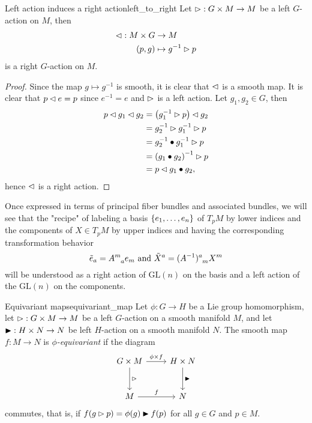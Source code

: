 \begin{proposition}{Left action induces a right action}{left_to_right}
    Let \(\mathbin{\vartriangleright} : G \times M \to M\) be a left \(G\)-action on \(M\), then
    \begin{align*}
        \mathbin{\vartriangleleft} : M \times G &\to M\\
                      (p,g)&\mapsto g^{-1} \mathbin{\vartriangleright} p
    \end{align*}
    is a right \(G\)-action on \(M.\)
\end{proposition}
\begin{proof}
    Since the map \(g \mapsto g^{-1}\) is smooth, it is clear that \(\mathbin{\vartriangleleft}\) is a smooth map. It is clear that \(p \mathbin{\vartriangleleft} e = p\) since \(e^{-1} = e\) and \(\mathbin{\vartriangleright}\) is a left action. Let \(g_1, g_2 \in G\), then
    \begin{align*}
        p \mathbin{\vartriangleleft} g_1 \mathbin{\vartriangleleft} g_2 &= \left(g_1^{-1} \mathbin{\vartriangleright} p\right) \mathbin{\vartriangleleft} g_2\\
                              &= g_2^{-1} \mathbin{\vartriangleright} g_1^{-1} \mathbin{\vartriangleright} p\\
                              &= g_2^{-1}\bullet g_1^{-1} \mathbin{\vartriangleright} p\\
                              &= \left(g_1\bullet g_2\right)^{-1} \mathbin{\vartriangleright} p\\
                              &= p \mathbin{\vartriangleleft} g_1 \bullet g_2,
    \end{align*}
    hence \(\mathbin{\vartriangleleft}\) is a right action.
\end{proof}
\begin{remark}
    Once expressed in terms of principal fiber bundles and associated bundles, we will see that the "recipe" of labeling a basis \(\{e_1, \dots, e_n\}\) of \(T_pM\) by lower indices and the components of \(X \in T_pM\) by upper indices and having the corresponding transformation behavior
    \begin{equation*}
        \tilde{e}_a = A\indices{^m_a}e_m\text{ and }\tilde{X}^a = (A^{-1})\indices{^a_m}X^m
    \end{equation*}
    will be understood as a right action of \(\mathrm{GL}(n)\) on the basis and a left action of the \(\mathrm{GL}(n)\) on the components.
\end{remark}

\begin{definition}{Equivariant maps}{equivariant_map}
    Let \(\phi : G \to H\) be a Lie group homomorphism, let \(\mathbin{\vartriangleright} : G \times M \to M\) be a left \(G\)-action on a smooth manifold \(M\), and let \(\mathbin{\blacktriangleright} : H \times N \to N\) be left \(H\)-action on a smooth manifold \(N\). The smooth map \(f : M \to N\) is \emph{\(\phi\)-equivariant} if the diagram
    \begin{equation*}
        \begin{tikzcd}[column sep = normal, row sep = large]
            G\times M \arrow{r}{\phi \times f} \arrow{d}{\lact} & H \times N\arrow{d}{\lactalt}\\
            M \arrow{r}{f} & N
        \end{tikzcd}
    \end{equation*}
    commutes, that is, if \(f(g \mathbin{\vartriangleright} p) = \phi(g) \mathbin{\blacktriangleright} f(p)\) for all \(g\in G\) and \(p \in M.\)
\end{definition}

